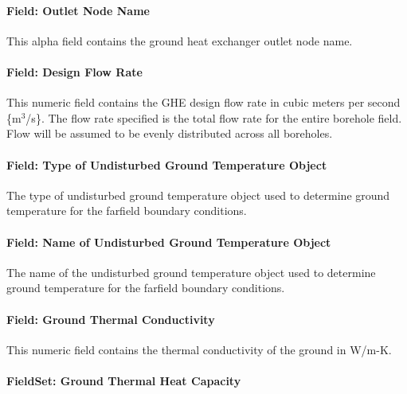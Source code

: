 \paragraph{Field: Outlet Node Name}\label{field-outlet-node-name-001}

This alpha field contains the ground heat exchanger outlet node name.

\paragraph{Field: Design Flow Rate}\label{field-design-flow-rate-000}

This numeric field contains the GHE design flow rate in cubic meters per second \{m\(^{3}\)/s\}. The flow rate specified is the total flow rate for the entire borehole field. Flow will be assumed to be evenly distributed across all boreholes.

\paragraph{Field: Type of Undisturbed Ground Temperature Object}\label{field-type-of-undisturbed-ground-temperature-object}

The type of undisturbed ground temperature object used to determine ground temperature for the farfield boundary conditions.

\paragraph{Field: Name of Undisturbed Ground Temperature Object}\label{field-name-of-undisturbed-ground-temperature-object}

The name of the undisturbed ground temperature object used to determine ground temperature for the farfield boundary conditions.

\paragraph{Field: Ground Thermal Conductivity}\label{field-ground-thermal-conductivity}

This numeric field contains the thermal conductivity of the ground in W/m-K.

\paragraph{FieldSet: Ground Thermal Heat Capacity}\label{fieldset-ground-thermal-heat-capacity}

